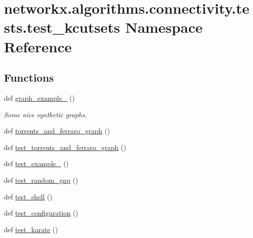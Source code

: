 \hypertarget{namespacenetworkx_1_1algorithms_1_1connectivity_1_1tests_1_1test__kcutsets}{}\section{networkx.\+algorithms.\+connectivity.\+tests.\+test\+\_\+kcutsets Namespace Reference}
\label{namespacenetworkx_1_1algorithms_1_1connectivity_1_1tests_1_1test__kcutsets}
\subsection*{Functions}
\begin{DoxyCompactItemize}
\item 
def \hyperlink{namespacenetworkx_1_1algorithms_1_1connectivity_1_1tests_1_1test__kcutsets_ad655e6c5a86e48e94a5534327d0355e6}{graph\+\_\+example\+\_} ()
\begin{DoxyCompactList}\small\item\em Some nice synthetic graphs. \end{DoxyCompactList}\item 
def \hyperlink{namespacenetworkx_1_1algorithms_1_1connectivity_1_1tests_1_1test__kcutsets_acd12ad4114cc30d847398efd2e440177}{torrents\+\_\+and\+\_\+ferraro\+\_\+graph} ()
\item 
def \hyperlink{namespacenetworkx_1_1algorithms_1_1connectivity_1_1tests_1_1test__kcutsets_aea8179a30d61f85770826a483ebef351}{test\+\_\+torrents\+\_\+and\+\_\+ferraro\+\_\+graph} ()
\item 
def \hyperlink{namespacenetworkx_1_1algorithms_1_1connectivity_1_1tests_1_1test__kcutsets_a59793c6b95aeae3ff33492b8a1e92975}{test\+\_\+example\+\_} ()
\item 
def \hyperlink{namespacenetworkx_1_1algorithms_1_1connectivity_1_1tests_1_1test__kcutsets_a5509b3be38ef0aa8396ec04ea9d399f9}{test\+\_\+random\+\_\+gnp} ()
\item 
def \hyperlink{namespacenetworkx_1_1algorithms_1_1connectivity_1_1tests_1_1test__kcutsets_ae442b8317d684d2947592efc9a676e2e}{test\+\_\+shell} ()
\item 
def \hyperlink{namespacenetworkx_1_1algorithms_1_1connectivity_1_1tests_1_1test__kcutsets_a91a486888ced1f8590026d588cfb4a76}{test\+\_\+configuration} ()
\item 
def \hyperlink{namespacenetworkx_1_1algorithms_1_1connectivity_1_1tests_1_1test__kcutsets_a7f7e7f191bf5a38926f150303fb0ab17}{test\+\_\+karate} ()

\end{DoxyCompactItemize}
